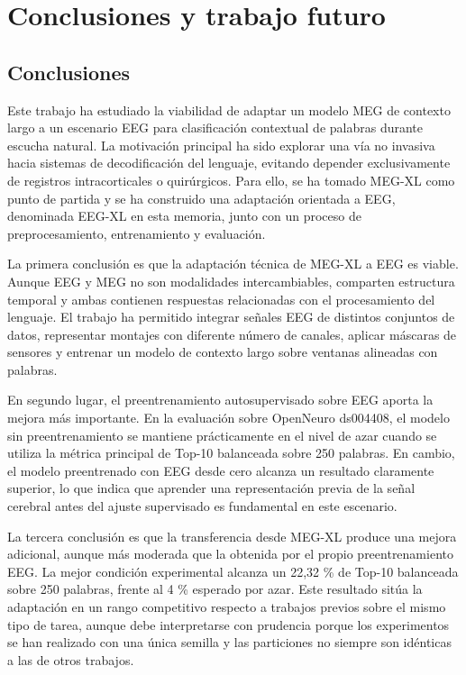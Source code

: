 
\chapter{Conclusiones y trabajo futuro}

\section{Conclusiones}

Este trabajo ha estudiado la viabilidad de adaptar un modelo MEG de contexto largo a un escenario EEG para clasificación contextual de palabras durante escucha natural. La motivación principal ha sido explorar una vía no invasiva hacia sistemas de decodificación del lenguaje, evitando depender exclusivamente de registros intracorticales o quirúrgicos. Para ello, se ha tomado MEG-XL como punto de partida y se ha construido una adaptación orientada a EEG, denominada EEG-XL en esta memoria, junto con un proceso de preprocesamiento, entrenamiento y evaluación.

La primera conclusión es que la adaptación técnica de MEG-XL a EEG es viable. Aunque EEG y MEG no son modalidades intercambiables, comparten estructura temporal y ambas contienen respuestas relacionadas con el procesamiento del lenguaje. El trabajo ha permitido integrar señales EEG de distintos conjuntos de datos, representar montajes con diferente número de canales, aplicar máscaras de sensores y entrenar un modelo de contexto largo sobre ventanas alineadas con palabras.

En segundo lugar, el preentrenamiento autosupervisado sobre EEG aporta la mejora más importante. En la evaluación sobre OpenNeuro ds004408, el modelo sin preentrenamiento se mantiene prácticamente en el nivel de azar cuando se utiliza la métrica principal de Top-10 balanceada sobre 250 palabras. En cambio, el modelo preentrenado con EEG desde cero alcanza un resultado claramente superior, lo que indica que aprender una representación previa de la señal cerebral antes del ajuste supervisado es fundamental en este escenario.

La tercera conclusión es que la transferencia desde MEG-XL produce una mejora adicional, aunque más moderada que la obtenida por el propio preentrenamiento EEG. La mejor condición experimental alcanza un 22,32 \% de Top-10 balanceada sobre 250 palabras, frente al 4 \% esperado por azar. Este resultado sitúa la adaptación en un rango competitivo respecto a trabajos previos sobre el mismo tipo de tarea, aunque debe interpretarse con prudencia porque los experimentos se han realizado con una única semilla y las particiones no siempre son idénticas a las de otros trabajos.

